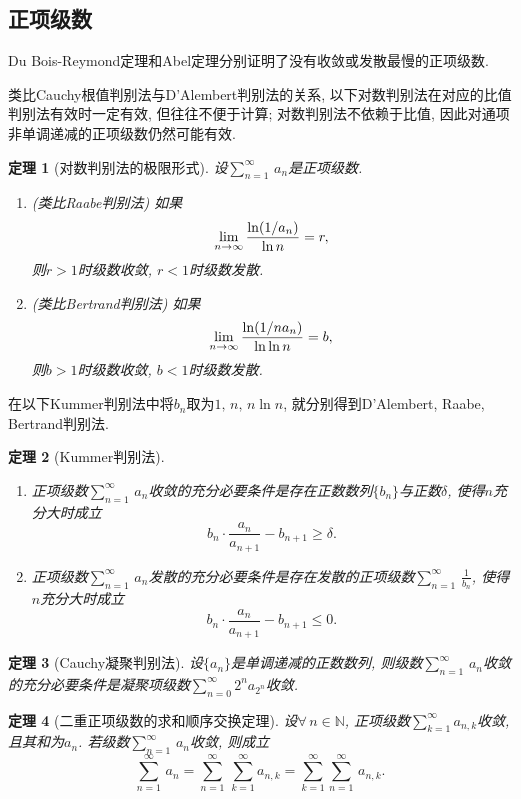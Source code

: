 \documentclass[11pt,a4paper]{ctexart}
\theoremstyle{thmseries} %
\newtheorem{thm}{定理}[section]
\theoremstyle{exerseries}
\newcommand{\bra}[1]{\mathopen{}\left(#1\right)}
\newcommand{\N}{\mathbb{N}}
\def \nti {\mathnormal{n}\to\infty}
\def \tseries {{\textstyle\sum\limits_{n=1}^{\infty}}\,} %
\def \dseries {\sum_{n=1}^{\infty}\,} %
\def \vs {\vspace{-1em}}
\begin{document}
\subsection{正项级数}
Du Bois-Reymond定理和Abel定理分别证明了没有收敛或发散最慢的正项级数. 

类比Cauchy根值判别法与D'Alembert判别法的关系, 以下对数判别法在对应的比值判别法有效时一定有效, 但往往不便于计算; 对数判别法不依赖于比值, 因此对通项非单调递减的正项级数仍然可能有效. 
\begin{thm}[对数判别法的极限形式]
	设$\tseries a_n$是正项级数. 
	\begin{enumerate}
		\item (类比Raabe判别法) 如果
		\[\lim_{\nti}\frac{\ln\bra{1/a_n}}{\ln n}=r,\]
		则$r>1$时级数收敛, $r<1$时级数发散. 
		\item (类比Bertrand判别法) 如果
		\[\lim_{\nti}\frac{\ln\bra{1/na_n}}{\ln\ln n}=b,\]
		则$b>1$时级数收敛, $b<1$时级数发散. 
	\end{enumerate}
\end{thm}

在以下Kummer判别法中将$b_n$取为$1,\,n,\,n\ln n$, 就分别得到D'Alembert, Raabe, Bertrand判别法. 
\begin{thm}[Kummer判别法]
	\phantom{text}
	\begin{enumerate}
		\item 正项级数$\tseries a_n$收敛的充分必要条件是存在正数数列$\{b_n\}$与正数$\delta$, 使得$n$充分大时成立\vs
		\[b_n\cdot\frac{a_n}{a_{n+1}}-b_{n+1}\geq\delta.\]\vs\vs
		\item 正项级数$\tseries a_n$发散的充分必要条件是存在发散的正项级数$\tseries\frac{1}{b_n}$, 使得$n$充分大时成立\vs
		\[b_n\cdot\frac{a_n}{a_{n+1}}-b_{n+1}\leq0.\]\vs
	\end{enumerate}\vspace{-1.5em}
\end{thm}

\begin{thm}[Cauchy凝聚判别法]
	设$\{a_n\}$是单调递减的正数数列, 则级数$\tseries a_n$收敛的充分必要条件是凝聚项级数$\textstyle\sum\limits_{n=0}^{\infty}2^na_{2^n}$收敛. 
\end{thm}

\begin{thm}[二重正项级数的求和顺序交换定理]
	设$\forall\,n\in\N$, 正项级数$\textstyle\sum\limits_{k=1}^{\infty}\displaystyle a_{n,k}$收敛, 且其和为$a_n$. 若级数$\tseries a_n$收敛, 则成立
	\[\dseries a_n=\dseries\sum_{k=1}^{\infty}a_{n,k}=\sum_{k=1}^{\infty}\dseries a_{n,k}.\]
\end{thm}
\end{document}
